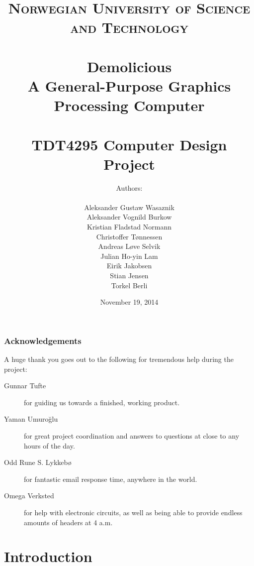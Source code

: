 \documentclass[a4paper, fontsize=11pt]{report} %
\title{ 
\normalfont \normalsize 
\textsc{Norwegian University of Science and Technology} \\ [25pt] %
\horrule{0.5pt} \\[0.4cm] %
\huge \textbf{Demolicious} \\ %
A General-Purpose Graphics Processing Computer \\
\horrule{2pt} \\[0.5cm] %
\large TDT4295 Computer Design Project \\
}
\author{Authors:\\ \\
Aleksander Gustaw Wasaznik\\
Aleksander Vognild Burkow\\
Kristian Fladstad Normann\\
Christoffer Tønnessen\\
Andreas Løve Selvik\\
Julian Ho-yin Lam\\
Eirik Jakobsen\\
Stian Jensen\\
Torkel Berli}
\date{\normalsize November 19, 2014}
\begin{document}

\maketitle

\newpage

\listoftodos
{}
\newpage



\thispagestyle{firststyle}

\newpage



\newpage

\section*{Acknowledgements}
A huge thank you goes out to the following for tremendous help during the project:

\vspace*{\fill}
\begin{description}

    \item[Gunnar Tufte]
        for guiding us towards a finished, working product.
    \item[Yaman Umuroğlu]
        for great project coordination and answers to questions at close to any hours of the day.
    \item[Odd Rune S. Lykkebø]
        for fantastic email response time, anywhere in the world.
    \item[Omega Verksted]
        for help with electronic circuits, as well as being able to provide endless amounts of headers at 4 a.m.

\end{description}
\vspace*{\fill}

\newpage

\tableofcontents

\setcounter{secnumdepth}{3}

\newpage


\part{Introduction}


\end{document}
